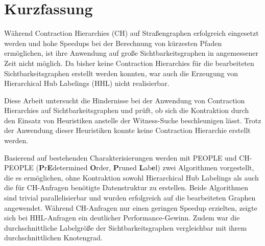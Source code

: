 \chapter*{Kurzfassung}

Während Contraction Hierarchies (CH) auf Straßengraphen erfolgreich eingesetzt werden und hohe Speedups bei der Berechnung von kürzesten Pfaden ermöglichen, ist ihre Anwendung auf große Sichtbarkeitsgraphen in angemessener Zeit nicht möglich.
Da bisher keine Contraction Hierarchies für die bearbeiteten Sichtbarkeitsgraphen erstellt werden konnten, war auch die Erzeugung von Hierarchical Hub Labelings (HHL) nicht realisierbar.

Diese Arbeit untersucht die Hindernisse bei der Anwendung von Contraction Hierarchies auf Sichtbarkeitsgraphen und prüft, ob sich die Kontraktion durch den Einsatz von Heuristiken anstelle der Witness-Suche beschleunigen lässt.
Trotz der Anwendung dieser Heuristiken konnte keine Contraction Hierarchie erstellt werden.

Basierend auf bestehenden Charakterisierungen werden mit PEOPLE und CH-PEOPLE (\textbf{P}r\textbf{E}determined \textbf{O}rder, \textbf{P}runed \textbf{L}ab\textbf{e}l) zwei Algorithmen vorgestellt, die es ermöglichen, ohne Kontraktion sowohl Hierarchical Hub Labelings als auch die für CH-Anfragen benötigte Datenstruktur zu erstellen.
Beide Algorithmen sind trivial parallelisierbar und wurden erfolgreich auf die bearbeiteten Graphen angewendet.
Während CH-Anfragen nur einen geringen Speedup erzielten, zeigte sich bei HHL-Anfragen ein deutlicher Performance-Gewinn.
Zudem war die durchschnittliche Labelgröße der Sichtbarkeitsgraphen vergleichbar mit ihrem durchschnittlichen Knotengrad.